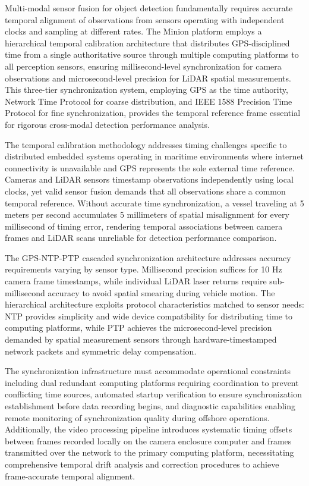 \documentclass{erauthesis}
\begin{document}
Multi-modal sensor fusion for object detection fundamentally requires accurate temporal alignment of observations from sensors operating with independent clocks and sampling at different rates.
The Minion platform employs a hierarchical temporal calibration architecture that distributes GPS-disciplined time from a single authoritative source through multiple computing platforms to all perception sensors, ensuring millisecond-level synchronization for camera observations and microsecond-level precision for LiDAR spatial measurements.
This three-tier synchronization system, employing GPS as the time authority, Network Time Protocol for coarse distribution, and IEEE 1588 Precision Time Protocol for fine synchronization, provides the temporal reference frame essential for rigorous cross-modal detection performance analysis.

The temporal calibration methodology addresses timing challenges specific to distributed embedded systems operating in maritime environments where internet connectivity is unavailable and GPS represents the sole external time reference.
Cameras and LiDAR sensors timestamp observations independently using local clocks, yet valid sensor fusion demands that all observations share a common temporal reference.
Without accurate time synchronization, a vessel traveling at 5 meters per second accumulates 5 millimeters of spatial misalignment for every millisecond of timing error, rendering temporal associations between camera frames and LiDAR scans unreliable for detection performance comparison.

The GPS-NTP-PTP cascaded synchronization architecture addresses accuracy requirements varying by sensor type.
Millisecond precision suffices for 10 Hz camera frame timestamps, while individual LiDAR laser returns require sub-millisecond accuracy to avoid spatial smearing during vehicle motion.
The hierarchical architecture exploits protocol characteristics matched to sensor needs: NTP provides simplicity and wide device compatibility for distributing time to computing platforms, while PTP achieves the microsecond-level precision demanded by spatial measurement sensors through hardware-timestamped network packets and symmetric delay compensation.

The synchronization infrastructure must accommodate operational constraints including dual redundant computing platforms requiring coordination to prevent conflicting time sources, automated startup verification to ensure synchronization establishment before data recording begins, and diagnostic capabilities enabling remote monitoring of synchronization quality during offshore operations.
Additionally, the video processing pipeline introduces systematic timing offsets between frames recorded locally on the camera enclosure computer and frames transmitted over the network to the primary computing platform, necessitating comprehensive temporal drift analysis and correction procedures to achieve frame-accurate temporal alignment.
\end{document}
